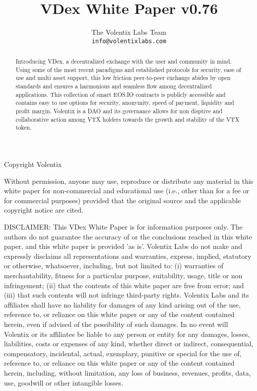 \documentclass[]{article}
\title{VDex White Paper v0.76}
\author{
		The Volentix Labs Team\\
	\texttt{info@volentixlabs.com}
}
\begin{document}
\tableofcontents
\maketitle
\begin{description}
\item Copyright  Volentix
\end{description}

{\tiny Without permission, anyone may use, reproduce or distribute any material in this white paper for non-commercial and educational use (i.e., other than for a fee or for commercial purposes) provided that the original source and the applicable copyright notice are cited.

DISCLAIMER: This VDex White Paper  is for information purposes only. The authors do not guarantee the accuracy of or the conclusions reached in this white paper, and this white paper is provided 'as is'. 
Volentix Labs do not make and expressly disclaims all representations and warranties, express, implied, statutory or otherwise, whatsoever, including, but not limited to: (i) warranties of merchantability, fitness for a particular purpose, suitability, usage, title or non infringement; (ii) that the contents of this white paper are free from error; and (iii) that such contents will not infringe third-party rights. Volentix Labs and its affiliates shall have no liability for damages of any kind arising out of the use, reference to, or reliance on this white paper or any of the content contained herein, even if advised of the possibility of such damages. In no event will Volentix or its affiliates be liable to any person or entity for any damages, losses, liabilities, costs or expenses of any kind, whether direct or indirect, consequential, compensatory, incidental, actual, exemplary, punitive or special for the use of, reference to, or reliance on this white paper or any of the content contained herein, including, without limitation, any loss of business, revenues, profits, data, use, goodwill or other intangible losses.}

\begin{abstract}

Introducing VDex, a decentralized exchange with the user and community in mind. 
Using some of the most recent paradigms and established protocols for security, 
ease of use and multi asset support, this low friction peer-to-peer exchange 
abides by open standards and ensures a harmonious and seamless flow among 
decentralized applications. This collection of smart EOS.IO contracts is publicly accessible 
and contains easy to use options for security, anonymity, speed of payment, liquidity and profit margin.
Volentix is a DAO and its governance allows for non disptive and collaborative action among VTX holders towards the growth and stability of the VTX token.
\end{abstract}
\end{document}
